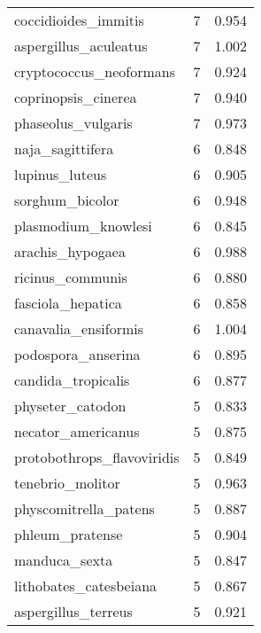 \begin{tabular}{lrr}
           coccidioides\_immitis &                   7 &     0.954 \\
          aspergillus\_aculeatus &                   7 &     1.002 \\
        cryptococcus\_neoformans &                   7 &     0.924 \\
            coprinopsis\_cinerea &                   7 &     0.940 \\
             phaseolus\_vulgaris &                   7 &     0.973 \\
               naja\_sagittifera &                   6 &     0.848 \\
                 lupinus\_luteus &                   6 &     0.905 \\
                sorghum\_bicolor &                   6 &     0.948 \\
            plasmodium\_knowlesi &                   6 &     0.845 \\
               arachis\_hypogaea &                   6 &     0.988 \\
               ricinus\_communis &                   6 &     0.880 \\
              fasciola\_hepatica &                   6 &     0.858 \\
           canavalia\_ensiformis &                   6 &     1.004 \\
             podospora\_anserina &                   6 &     0.895 \\
             candida\_tropicalis &                   6 &     0.877 \\
               physeter\_catodon &                   5 &     0.833 \\
             necator\_americanus &                   5 &     0.875 \\
     protobothrops\_flavoviridis &                   5 &     0.849 \\
               tenebrio\_molitor &                   5 &     0.963 \\
          physcomitrella\_patens &                   5 &     0.887 \\
                phleum\_pratense &                   5 &     0.904 \\
                  manduca\_sexta &                   5 &     0.847 \\
         lithobates\_catesbeiana &                   5 &     0.867 \\
            aspergillus\_terreus &                   5 &     0.921 \\

\end{tabular}
